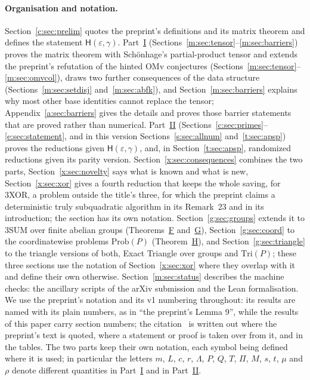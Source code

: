 \documentclass[11pt]{article}
\theoremstyle{definition}
\theoremstyle{remark}
\newcommand{\Prob}{\mathrm{Prob}}
\newcommand{\Hyp}{\mathsf{H}}
\begin{document}
\paragraph{Organisation and notation.} Section~\ref{c:sec:prelim} quotes the preprint's definitions and its matrix theorem and defines the statement $\Hyp(\varepsilon,\gamma)$. Part~\hyperref[m:partI]{I} (Sections~\ref{m:sec:tensor}--\ref{m:sec:barriers}) proves the matrix theorem with Schönhage's partial-product tensor and extends the preprint's refutation of the hinted OMv conjectures (Sections~\ref{m:sec:tensor}--\ref{m:sec:omvcol}), draws two further consequences of the data structure (Sections~\ref{m:sec:setdisj} and~\ref{m:sec:abfk}), and Section~\ref{m:sec:barriers} explains why most other base identities cannot replace the tensor; Appendix~\ref{a:sec:barriers} gives the details and proves those barrier statements that are proved rather than numerical. Part~\hyperref[m:partII]{II} (Sections~\ref{c:sec:primes}--\ref{e:sec:statement}, and in this version Sections~\ref{s:sec:allnum} and~\ref{t:sec:apsp}) proves the reductions given $\Hyp(\varepsilon,\gamma)$, and, in Section~\ref{t:sec:apsp}, randomized reductions given its parity version. Section~\ref{x:sec:consequences} combines the two parts, Section~\ref{x:sec:novelty} says what is known and what is new, Section~\ref{x:sec:xor} gives a fourth reduction that keeps the whole saving, for 3XOR, a problem outside the title's three, for which the preprint claims a deterministic truly subquadratic algorithm in its Remark~23 and in its introduction; the section has its own notation. Section~\ref{g:sec:groups} extends it to 3SUM over finite abelian groups (Theorems~\hyperref[m:introF]{F} and~\hyperref[m:introG]{G}), Section~\ref{g:sec:coord} to the coordinatewise problems $\Prob(P)$ (Theorem~\hyperref[m:introH]{H}), and Section~\ref{g:sec:triangle} to the triangle versions of both, Exact Triangle over groups and $\mathrm{Tri}(P)$; these three sections use the notation of Section~\ref{x:sec:xor} where they overlap with it and define their own otherwise. Section~\ref{m:sec:status} describes the machine checks: the ancillary scripts of the arXiv submission and the Lean formalisation. We use the preprint's notation and its v1 numbering throughout: its results are named with its plain numbers, as in ``the preprint's Lemma 9'', while the results of this paper carry section numbers; the citation~\cite{ZT} is written out where the preprint's text is quoted, where a statement or proof is taken over from it, and in the tables. The two parts keep their own notation, each symbol being defined where it is used; in particular the letters $m$, $L$, $c$, $r$, $\Lambda$, $P$, $Q$, $T$, $\Pi$, $M$, $s$, $t$, $\mu$ and $\rho$ denote different quantities in Part~\hyperref[m:partI]{I} and in Part~\hyperref[m:partII]{II}.
\end{document}

